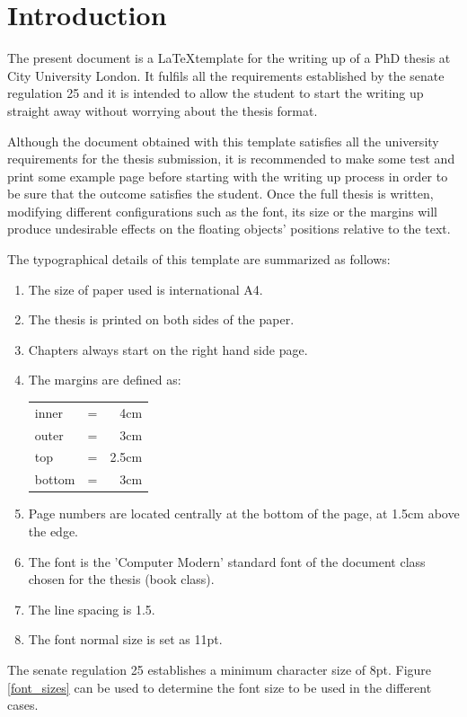 \chapter{Introduction}\label{ch_1}

The present document is a \LaTeX template for the writing up of a PhD thesis at City University London. It fulfils all the requirements established by the senate regulation 25 \citep{senate_regulation_25} and it is intended to allow the student to start the writing up straight away without worrying about the thesis format. 

Although the document obtained with this template satisfies all the university requirements for the thesis submission, it is recommended to make some test and print some example page before starting with the writing up process in order to be sure that the outcome satisfies the student. Once the full thesis is written, modifying different configurations such as the font, its size or the margins will produce undesirable effects on the floating objects' positions relative to the text.  

The typographical details of this template are summarized as follows:
\begin{enumerate}[a]
\item The size of paper used is international A4.
\item The thesis is printed on both sides of the paper.
\item Chapters always start on the right hand side page.
\item The margins are defined as: \\
	\begin{tabular}{lcr}
	inner & = & 4cm\\
	outer & = & 3cm\\
	top & = & 2.5cm\\
	bottom & = & 3cm
	\end{tabular}
\item Page numbers are located centrally at the bottom of the page, at 1.5cm above the edge. 
\item The font is the 'Computer Modern' standard font of the document class chosen for the thesis (book class).
\item The line spacing is 1.5.
\item The font normal size is set as 11pt. 
\end{enumerate}

The senate regulation 25 establishes a minimum character size of 8pt. Figure \ref{font_sizes} can be used to determine the font size to be used in the different cases.

